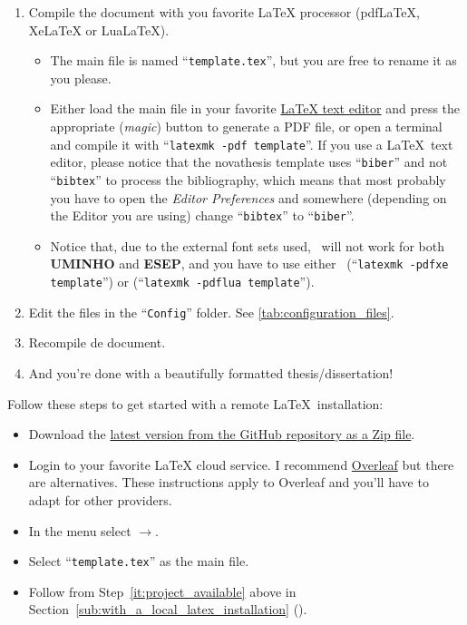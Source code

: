 {\begin{enumerate}
  \item Compile the document with you favorite LaTeX processor (pdfLaTeX, XeLaTeX or LuaLaTeX).
  \begin{itemize}
    \item The main file is named “\verb!template.tex!”, but you are free to rename it as you please.
    \item Either load the main file in your favorite \href{https://en.wikipedia.org/wiki/Comparison_of_TeX_editors}{LaTeX text editor} and press the appropriate (\emph{magic}) button to generate a PDF file, or open a terminal and compile it with “\verb!latexmk -pdf template!”. If you use a \LaTeX\ text editor, please notice that the \gls{novathesis} template uses “\verb!biber!” and not “\verb!bibtex!” to process the bibliography, which means that most probably you have to open the \emph{Editor Preferences} and somewhere (depending on the Editor you are using) change “\verb!bibtex!” to “\verb!biber!”.
    \item Notice that, due to the external font sets used, \pdfLaTeX\ will not work for both \textbf{UMINHO} and \textbf{ESEP}, and you have to use either \XeLaTeX\ (“\verb!latexmk -pdfxe template!”) or \LuaLaTeX (“\verb!latexmk -pdflua template!”).
  \end{itemize}
  \item Edit the files in the “\texttt{Config}” folder.  See \autoref{tab:configuration_files}.
  \item Recompile de document.
  \item And you're done with a beautifully formatted thesis/dissertation! {\setlength{\twemojiDefaultHeight}{1.5\twemojiDefaultHeight}\emojiSmile}
\end{enumerate}




Follow these steps to get started with a remote \LaTeX\ installation:

\begin{itemize}
  \item Download the \href{https://github.com/joaomlourenco/novathesis/archive/main.zip}{latest version from the GitHub repository as a Zip file}.
  \item Login to your favorite LaTeX cloud service. I recommend \href{https://www.overleaf.com/?r=f5160636&rm=d&rs=b}{Overleaf} but there are alternatives. These instructions apply to Overleaf and you'll have to adapt for other providers.
  \item In the menu select $\rightarrow$.
  \item Select “\verb!template.tex!” as the main file.
  \item Follow from Step~\ref{it:project_available} above in Section~\ref{sub:with_a_local_latex_installation} ().
\end{itemize}
\fi

}
